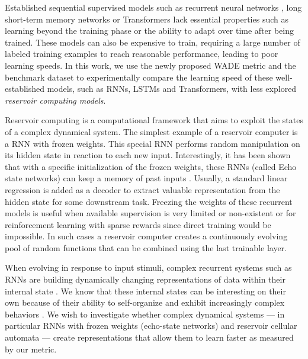 Established sequential supervised models such as recurrent neural networks
\parencite[RNNs; ][]{elmanFindingStructureTime1990}, long short-term memory
networks \parencite[LSTMs;][]{hochreiterLongShortTermMemory1997} or Transformers
\parencite{vaswaniAttentionAllYou2017} lack essential properties such as
learning beyond the training phase or the ability to adapt over time after being
trained. These models can also be expensive to train, requiring a large number
of labeled training examples to reach reasonable performance, leading to poor
learning speeds. In this work, we use the newly proposed \ac{WADE} metric and
the benchmark dataset to experimentally compare the learning speed of these
well-established models, such as RNNs, LSTMs and Transformers, with less
explored {\em reservoir computing models}.

Reservoir computing is a computational framework that aims to exploit the states
of a complex dynamical system. The simplest example of a reservoir computer is a
\ac{RNN} with frozen weights. This special \ac{RNN} performs random manipulation
on its hidden state in reaction to each new input. Interestingly, it has been
shown that with a specific initialization of the frozen weights, these \ac{RNN}s
(called Echo state networks) can keep a memory of past inputs
\parencite{jaegerEchoStateApproach2001}. Usually, a standard linear regression
is added as a decoder to extract valuable representation from the hidden state
for some downstream task. Freezing the weights of these recurrent models is
useful when available supervision is very limited or non-existent or for
reinforcement learning with sparse rewards since direct training would be
impossible. In such cases a reservoir computer creates a continuously evolving
pool of random functions that can be combined using the last trainable layer.


When evolving in response to input stimuli, complex recurrent systems such as
\acp{RNN} are building dynamically changing representations of data within their
internal state \parencite{boccaraModelingComplexSystems2010}. We know that these
internal states can be interesting on their own because of their ability to
self-organize and exhibit increasingly complex behaviors
\parencite{koppelAlmostMachineindependentTheory1991,
  bennettLogicalDepthPhysical1995, allenEvolutionEmergenceLearning2003,
  goldsteinEmergenceComplexSystems2011, cisnerosEvolvingStructuresComplex2019}.
We wish to investigate whether complex dynamical systems --- in
particular RNNs with frozen weights (echo-state networks)
\parencite{jaegerEchoStateApproach2001} and reservoir cellular automata
\parencite{yilmazReservoirComputingUsing2014} --- create representations that
allow them to learn faster as measured by our metric.

